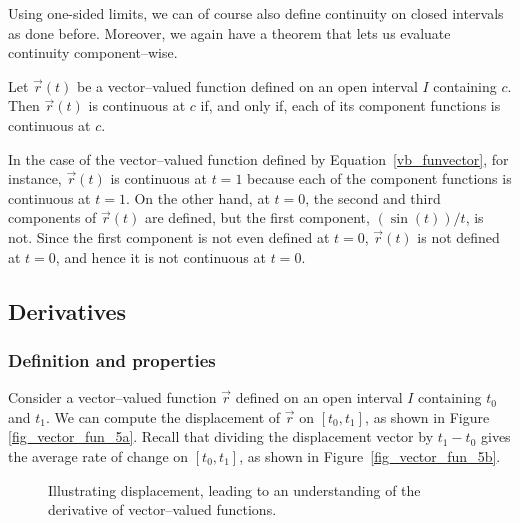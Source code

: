  Using one-sided limits, we can of course also define continuity on closed intervals as done before. Moreover, we again have a theorem that lets us evaluate continuity component--wise.

\begin{theorem}\label{thm:vvf_continuity}
Let $\vec r(t)$ be a vector--valued function defined on an open interval $I$ containing $c$. Then $\vec r(t)$ is continuous at $c$ if, and only if, each of its component functions is continuous at $c$.
\end{theorem}

In the case of the vector--valued function defined by Equation~\eqref{vb_funvector}, for instance, $\vec r(t)$ is continuous at $t=1$ because each of the component functions is continuous at $t=1$. On the other hand, at $t=0$, the second and third components of $\vec r(t)$ are defined, but the first component, $(\sin (t))/t$, is not. Since the first component is not even defined at $t=0$, $\vec r(t)$ is not defined at $t=0$, and hence it is not continuous at $t=0$.

\subsection{Derivatives}
\subsubsection{Definition and properties}
Consider a vector--valued function $\vec r$ defined on an open interval $I$ containing $t_0$ and $t_1$. We can compute the displacement of $\vec r$ on $[t_0,t_1]$, as shown in Figure \ref{fig_vector_fun_5a}. Recall that dividing the displacement vector by $t_1-t_0$ gives the average rate of change on $[t_0,t_1]$, as shown in Figure~\ref{fig_vector_fun_5b}. 

\begin{figure}[h]
\centering
\centerline{
\hspace{0.1cm}
}
\caption{Illustrating displacement, leading to an understanding of the derivative of vector--valued functions.}
\end{figure}

